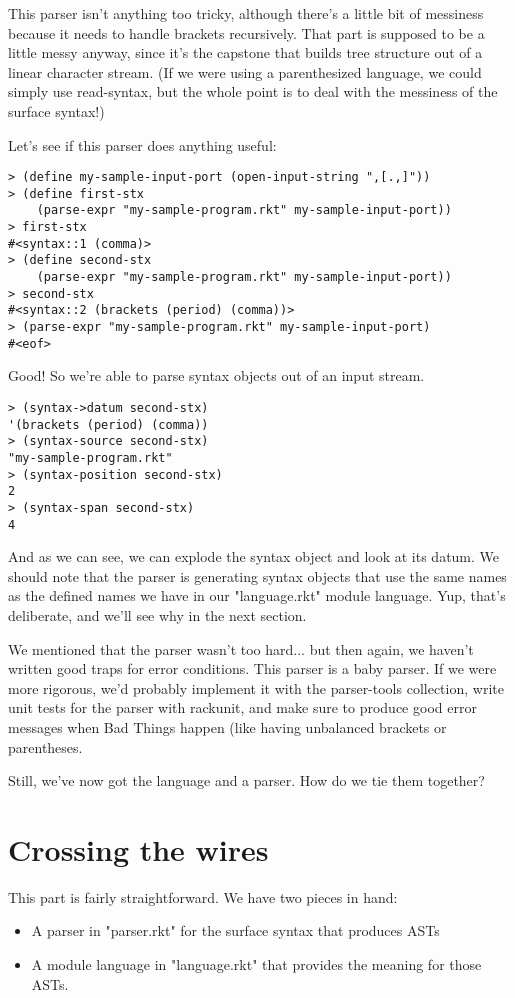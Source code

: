 \documentclass{article}
\begin{document}
This parser isn’t anything too tricky, although there’s a little bit of messiness because it needs to handle brackets recursively. That part is supposed to be a little messy anyway, since it’s the capstone that builds tree structure out of a linear character stream. (If we were using a parenthesized language, we could simply use read-syntax, but the whole point is to deal with the messiness of the surface syntax!)


Let’s see if this parser does anything useful:
\begin{verbatim}
> (define my-sample-input-port (open-input-string ",[.,]"))
> (define first-stx
    (parse-expr "my-sample-program.rkt" my-sample-input-port))
> first-stx
#<syntax::1 (comma)>
> (define second-stx
    (parse-expr "my-sample-program.rkt" my-sample-input-port))
> second-stx
#<syntax::2 (brackets (period) (comma))>
> (parse-expr "my-sample-program.rkt" my-sample-input-port)
#<eof>
\end{verbatim}
Good! So we’re able to parse syntax objects out of an input stream.
\begin{verbatim}
> (syntax->datum second-stx)
'(brackets (period) (comma))
> (syntax-source second-stx)
"my-sample-program.rkt"
> (syntax-position second-stx)
2
> (syntax-span second-stx)
4
\end{verbatim}
And as we can see, we can explode the syntax object and look at its datum. We should note that the parser is generating syntax objects that use the same names as the defined names we have in our "language.rkt" module language. Yup, that’s deliberate, and we’ll see why in the next section.


We mentioned that the parser wasn’t too hard... but then again, we haven’t written good traps for error conditions. This parser is a baby parser. If we were more rigorous, we’d probably implement it with the parser-tools collection, write unit tests for the parser with rackunit, and make sure to produce good error messages when Bad Things happen (like having unbalanced brackets or parentheses.

Still, we’ve now got the language and a parser. How do we tie them together?

\section{Crossing the wires}
This part is fairly straightforward. We have two pieces in hand:

\begin{itemize}
\item A parser in "parser.rkt" for the surface syntax that produces ASTs

\item A module language in "language.rkt" that provides the meaning for those ASTs.
\end{itemize}
\end{document}
